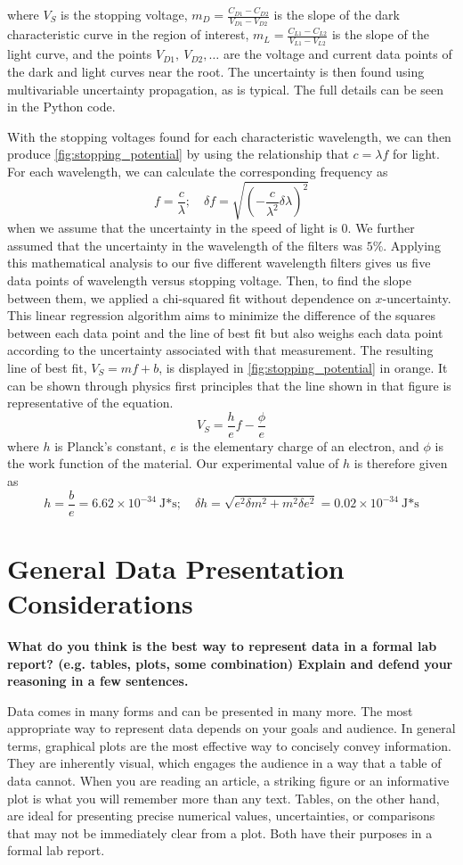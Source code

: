 \documentclass[prX,nofootinbib,notitlepage]{revtex4-1}
\begin{document}
where $V_S$ is the stopping voltage, $m_D = \frac{C_{D1} - C_{D2}}{V_{D1} - V_{D2}}$ is the slope of the dark characteristic curve in the region of interest, $m_L = \frac{C_{L1} - C_{L2}}{V_{L1} - V_{L2}}$ is the slope of the light curve, and the points $V_{D1}, ~ V_{D2}, \dots$ are the voltage and current data points of the dark and light curves near the root. The uncertainty is then found using multivariable uncertainty propagation, as is typical. The full details can be seen in the Python code. 

With the stopping voltages found for each characteristic wavelength, we can then produce \ref{fig:stopping_potential} by using the relationship that $c = \lambda f$ for light. For each wavelength, we can calculate the corresponding frequency as
$$
f = \frac{c}{\lambda}; \quad \delta f = \sqrt{(- \frac{c}{\lambda^{2}} \delta \lambda)^{2}}
$$
when we assume that the uncertainty in the speed of light is 0. We further assumed that the uncertainty in the wavelength of the filters was $5\%$. Applying this mathematical analysis to our five different wavelength filters gives us five data points of wavelength versus stopping voltage. Then, to find the slope between them, we applied a chi-squared fit without dependence on $x$-uncertainty. This linear regression algorithm aims to minimize the difference of the squares between each data point and the line of best fit but also weighs each data point according to the uncertainty associated with that measurement. The resulting line of best fit, $V_{S} = mf + b$, is displayed in \ref{fig:stopping_potential} in orange. It can be shown through physics first principles that the line shown in that figure is representative of the equation. 
$$
V_{S} = \frac{h}{e} f - \frac{\phi}{e}
$$
where $h$ is Planck's constant, $e$ is the elementary charge of an electron, and $\phi$ is the work function of the material. Our experimental value of $h$ is therefore given as 
$$
\boxed{h = \frac{b}{e} = 6.62 \times 10^{-34} ~ \text{J*s}; \quad \delta h = \sqrt{e^{2} \delta m^2  + m^2 \delta e^2} = 0.02 \times 10^{-34} ~ \text{J*s}}
$$





\section{General Data Presentation Considerations}

\textbf{What do you think is the best way to represent data in a formal lab report? (e.g. tables, plots, some combination) Explain and defend your reasoning in a few sentences.}

Data comes in many forms and can be presented in many more. The most appropriate way to represent data depends on your goals and audience. In general terms, graphical plots are the most effective way to concisely convey information. They are inherently visual, which engages the audience in a way that a table of data cannot. When you are reading an article, a striking figure or an informative plot is what you will remember more than any text. Tables, on the other hand, are ideal for presenting precise numerical values, uncertainties, or comparisons that may not be immediately clear from a plot. Both have their purposes in a formal lab report.
\end{document}
